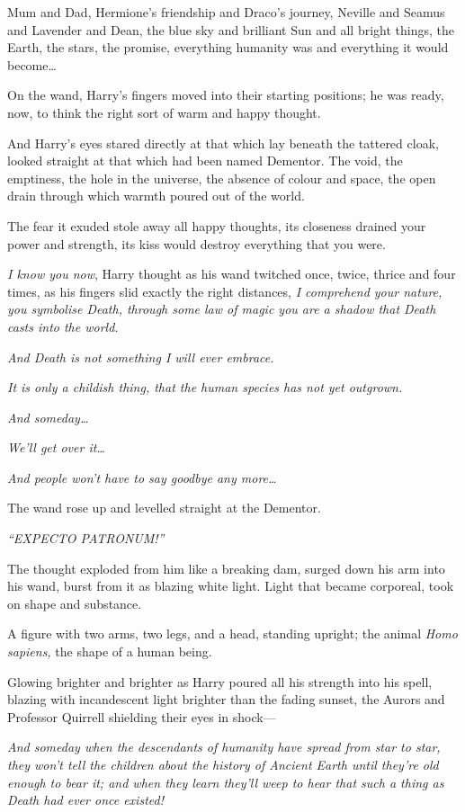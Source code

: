 Mum and Dad, Hermione's friendship and Draco's journey, Neville and
Seamus and Lavender and Dean, the blue sky and brilliant Sun and all
bright things, the Earth, the stars, the promise, everything humanity
was and everything it would become\ldots{}

On the wand, Harry's fingers moved into their starting positions; he was
ready, now, to think the right sort of warm and happy thought.

And Harry's eyes stared directly at that which lay beneath the tattered
cloak, looked straight at that which had been named Dementor. The void,
the emptiness, the hole in the universe, the absence of colour and
space, the open drain through which warmth poured out of the world.

The fear it exuded stole away all happy thoughts, its closeness drained
your power and strength, its kiss would destroy everything that you
were.

\emph{I know you now}, Harry thought as his wand twitched once, twice,
thrice and four times, as his fingers slid exactly the right distances,
\emph{I comprehend your nature, you symbolise Death, through some law of
magic you are a shadow that Death casts into the world.}

\emph{And Death is not something I will ever embrace.}

\emph{It is only a childish thing, that the human species has not yet
outgrown.}

\emph{And someday\ldots{}}

\emph{We'll get over it\ldots{}}

\emph{And people won't have to say goodbye any more\ldots{}}

The wand rose up and levelled straight at the Dementor.

\emph{``EXPECTO PATRONUM!''}

The thought exploded from him like a breaking dam, surged down his arm
into his wand, burst from it as blazing white light. Light that became
corporeal, took on shape and substance.

A figure with two arms, two legs, and a head, standing upright; the
animal \emph{Homo sapiens,} the shape of a human being.

Glowing brighter and brighter as Harry poured all his strength into his
spell, blazing with incandescent light brighter than the fading sunset,
the Aurors and Professor Quirrell shielding their eyes in shock---

\emph{And someday when the descendants of humanity have spread from star
to star, they won't tell the children about the history of Ancient Earth
until they're old enough to bear it; and when they learn they'll weep to
hear that such a thing as Death had ever once existed!}

